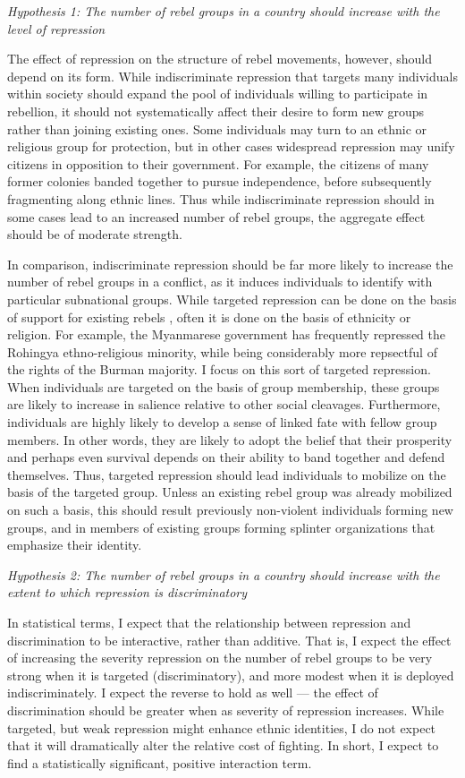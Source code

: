 \documentclass[12pt,]{book}
\begin{document}
\emph{Hypothesis 1: The number of rebel groups in a country should
increase with the level of repression}

The effect of repression on the structure of rebel movements, however,
should depend on its form. While indiscriminate repression that targets
many individuals within society should expand the pool of individuals
willing to participate in rebellion, it should not systematically affect
their desire to form new groups rather than joining existing ones. Some
individuals may turn to an ethnic or religious group for protection, but
in other cases widespread repression may unify citizens in opposition to
their government. For example, the citizens of many former colonies
banded together to pursue independence, before subsequently fragmenting
along ethnic lines. Thus while indiscriminate repression should in some
cases lead to an increased number of rebel groups, the aggregate effect
should be of moderate strength.

In comparison, indiscriminate repression should be far more likely to
increase the number of rebel groups in a conflict, as it induces
individuals to identify with particular subnational groups. While
targeted repression can be done on the basis of support for existing
rebels \citep{Kalyvas2006}, often it is done on the basis of ethnicity
or religion. For example, the Myanmarese government has frequently
repressed the Rohingya ethno-religious minority, while being
considerably more repsectful of the rights of the Burman majority. I
focus on this sort of targeted repression. When individuals are targeted
on the basis of group membership, these groups are likely to increase in
salience relative to other social cleavages. Furthermore, individuals
are highly likely to develop a sense of linked fate with fellow group
members. In other words, they are likely to adopt the belief that their
prosperity and perhaps even survival depends on their ability to band
together and defend themselves. Thus, targeted repression should lead
individuals to mobilize on the basis of the targeted group. Unless an
existing rebel group was already mobilized on such a basis, this should
result previously non-violent individuals forming new groups, and in
members of existing groups forming splinter organizations that emphasize
their identity.

\emph{Hypothesis 2: The number of rebel groups in a country should
increase with the extent to which repression is discriminatory}

In statistical terms, I expect that the relationship between repression
and discrimination to be interactive, rather than additive. That is, I
expect the effect of increasing the severity repression on the number of
rebel groups to be very strong when it is targeted (discriminatory), and
more modest when it is deployed indiscriminately. I expect the reverse
to hold as well --- the effect of discrimination should be greater when
as severity of repression increases. While targeted, but weak repression
might enhance ethnic identities, I do not expect that it will
dramatically alter the relative cost of fighting. In short, I expect to
find a statistically significant, positive interaction term.
\end{document}
